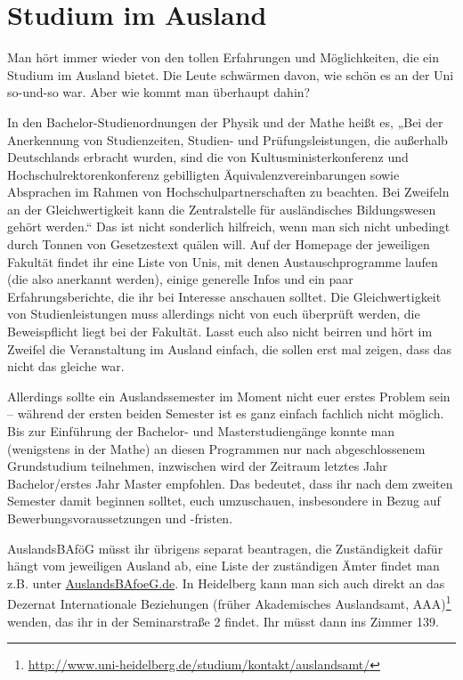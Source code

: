 \section{Studium im Ausland}
Man hört immer wieder von den tollen Erfahrungen und Möglichkeiten, die ein Studium im Ausland bietet. Die Leute schwärmen davon, wie schön es an der Uni so-und-so war. Aber wie kommt man überhaupt dahin?

In den Bachelor-Studienordnungen der Physik und der Mathe heißt es, „Bei der Anerkennung von Studienzeiten, Studien- und Prüfungsleistungen, die außerhalb Deutschlands erbracht wurden, sind die von Kultusministerkonferenz und Hochschulrektorenkonferenz gebilligten Äquivalenzvereinbarungen sowie Absprachen im Rahmen von Hochschulpartnerschaften zu beachten. Bei Zweifeln an der Gleichwertigkeit kann die Zentralstelle für ausländisches Bildungswesen gehört werden.“ Das ist nicht sonderlich hilfreich, wenn man sich nicht unbedingt durch Tonnen von Gesetzestext quälen will. Auf der Homepage der jeweiligen Fakultät findet ihr eine Liste von Unis, mit denen Austauschprogramme laufen (die also anerkannt werden), einige generelle Infos und ein paar Erfahrungsberichte, die ihr bei Interesse anschauen solltet. Die Gleichwertigkeit von Studienleistungen muss allerdings nicht von euch überprüft werden, die Beweispflicht liegt bei der Fakultät. Lasst euch also nicht beirren und hört im Zweifel die Veranstaltung im Ausland einfach, die sollen erst mal zeigen, dass das nicht das gleiche war.

Allerdings sollte ein Auslandssemester im Moment nicht euer erstes Problem sein -- während der ersten beiden Semester ist es ganz einfach fachlich nicht möglich. Bis zur Einführung der Bachelor- und Masterstudiengänge konnte man (wenigstens in der Mathe) an diesen Programmen nur nach abgeschlossenem Grundstudium teilnehmen, inzwischen wird der Zeitraum letztes Jahr Bachelor/erstes Jahr Master empfohlen. Das bedeutet, dass ihr nach dem zweiten Semester damit beginnen solltet, euch umzuschauen, insbesondere in Bezug auf Bewerbungsvoraussetzungen und -fristen.

AuslandsBAföG müsst ihr übrigens separat beantragen, die Zu\-stän\-dig\-keit dafür hängt vom jeweiligen Ausland ab, eine Liste der zuständigen Ämter findet man z.B. unter \url{AuslandsBAfoeG.de}. In Heidelberg kann man sich auch direkt an das Dezernat Internationale Beziehungen (früher Akademisches Auslandsamt, AAA)\footnote{\url{http://www.uni-heidelberg.de/studium/kontakt/auslandsamt/}} wenden, das ihr in der Seminarstraße 2 findet. Ihr müsst dann ins Zimmer 139.

